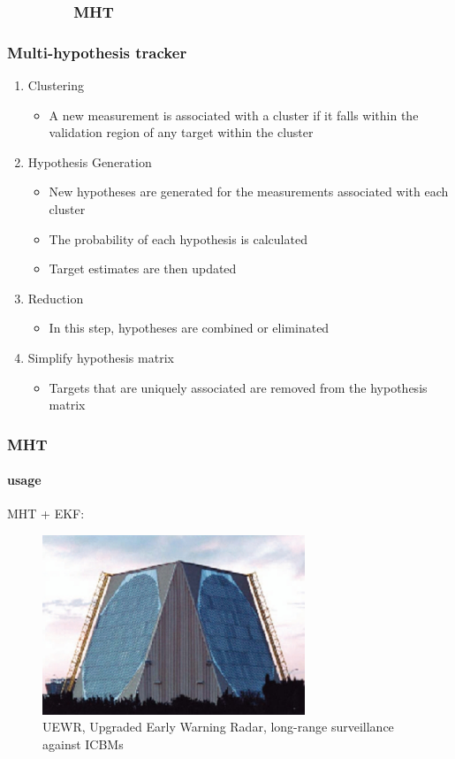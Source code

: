 \subsubsection{\ \ \ \ \ \ \ \ MHT }
\begin{frame}
\frametitle{Multi-hypothesis tracker}
\logoCSIPCPL\mypagenum
	\begin{enumerate}
	\item {\color{red}Clustering}
		\begin{itemize}
			\item A new measurement is associated with a cluster if it falls within the validation region of any target within the cluster
		\end{itemize}
	\item {\color{red}Hypothesis Generation}
		\begin{itemize} 
			\item New hypotheses are generated for the measurements associated with each cluster
			\item The probability of each hypothesis is calculated
			\item Target estimates are then updated
		\end{itemize}
	\item {\color{red}Reduction}
		\begin{itemize}
			\item In this step, hypotheses are combined or eliminated
		\end{itemize}
	\item {\color{red}Simplify hypothesis matrix}
		\begin{itemize}
			\item Targets that are uniquely associated are removed from the hypothesis matrix
		\end{itemize}
	\end{enumerate}
\end{frame}




\begin{frame}
\frametitle{MHT}
\framesubtitle{usage}
\logoCSIPCPL\mypagenum
	MHT + EKF:
	\begin{figure}
		\includegraphics[width=0.7\textwidth]{figs/TRK_MHT_example_UEWR.jpg}
		\caption {UEWR, Upgraded Early Warning Radar, long-range surveillance against ICBMs}
	\end{figure}
\end{frame}


